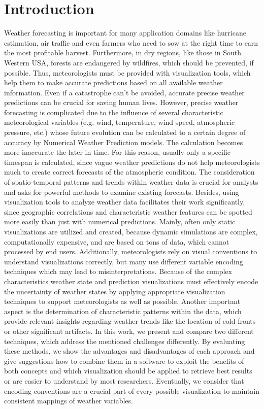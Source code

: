 \documentclass[citeauthoryear]{llncs}
\begin{document}
\section{Introduction}
%
Weather forecasting is important for many application domains like hurricane estimation, air traffic and even farmers who need to sow at the right time to earn the most profitable harvest. Furthermore, in dry regions, like those in South Western USA, forests are endangered by wildfires, which should be prevented, if possible.
Thus, meteorologists must be provided with visualization tools, which help them to make accurate predictions based on all available weather information. Even if a catastrophe can't be avoided, accurate precise weather predictions can be crucial for saving human lives. However, precise weather forecasting is complicated due to the influence of several characteristic meteorological variables (e.g. wind, temperature, wind speed, atmospheric pressure, etc.) whose future evolution can be calculated to a certain degree of accuracy by Numerical Weather Prediction models. The calculation becomes more inaccurate the later in time. For this reason, usually only a specific timespan is calculated, since vague weather predictions do not help meteorologists much to create correct forecasts of the atmospheric condition. The consideration of spatio-temporal patterns and trends within weather data is crucial for analysts and asks for powerful methods to examine existing forecasts. Besides, using visualization tools to analyze weather data facilitates their work significantly, since geographic correlations and characteristic weather features can be spotted more easily than just with numerical predictions. Mainly, often only static visualizations are utilized and created, because dynamic simulations are complex, computationally expensive, and are based on tons of data, which cannot processed by end users. Additionally, meteorologists rely on visual conventions to understand visualizations correctly, but many use different variable encoding techniques which may lead to misinterpretations. Because of the complex characteristics weather state and prediction visualizations must effectively encode the uncertainty of weather states by applying appropriate visualization techniques to support meteorologists as well as possible. Another important aspect is the determination of characteristic patterns within the data, which provide relevant insights regarding weather trends like the location of cold fronts or other significant artifacts. In this work, we present and compare two different techniques, which address the mentioned challenges differently. By evaluating these methods, we show the advantages and disadvantages of each approach and give suggestions how to combine them in a software to exploit the benefits of both concepts and which visualization should be applied to retrieve best results or are easier to understand by most researchers. Eventually, we consider that encoding conventions are a crucial part of every possible visualization to maintain consistent mappings of weather variables.
\end{document}

